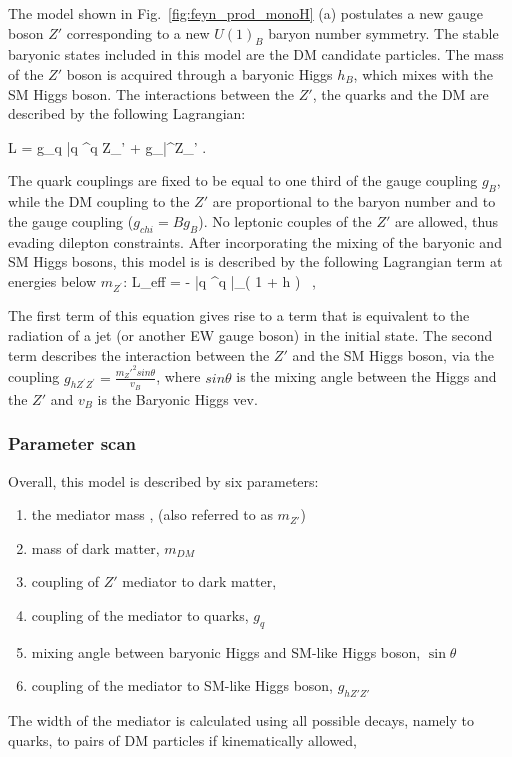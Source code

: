 The model shown in Fig.~\ref{fig:feyn_prod_monoH} (a)
postulates a new gauge boson $Z'$ corresponding to a new $U(1)_B$ baryon 
number symmetry. The stable baryonic states included in this model are the DM candidate particles.
The mass of the $Z'$ boson is acquired through a baryonic Higgs $h_B$, which mixes with the 
SM Higgs boson. The interactions between the $Z'$, the quarks and the DM are described by 
the following Lagrangian:   

\be \label{ZprimeDM}
	L =  g_q  \bar q \gamma^\mu q  Z_\mu' +
%
	 g_\chi  \bar\chi \gamma^\mu \chi Z_\mu' .
\ee

The quark couplings \gq are fixed to be equal to one third of the gauge coupling $g_B$, 
while the DM coupling to the $Z'$ are proportional to the baryon number and to the gauge coupling 
($g_{chi} = B g_B$). No leptonic couples of the $Z'$ are allowed, thus evading dilepton constraints. 
After incorporating the mixing of the baryonic and SM Higgs bosons, this model is 
is described by the following Lagrangian term at energies below $m_{Z^\prime}$: 
 \be \label{U1Beft}
 L_{\rm eff} = -  \bar{q} \gamma^\mu q \bar\chi \gamma_\mu \chi \Big( 1 +  h \Big) \, ,
 \ee

The first term of this equation gives rise to a term that is equivalent to the 
radiation of a jet (or another EW gauge boson) in the initial state. 
The second term describes the interaction between the $Z'$ and the SM Higgs boson,
via the coupling $g_{h Z^\prime Z^\prime} = \frac{m_Z'^2 sin\theta}{v_B}$, where
$sin\theta$ is the mixing angle between the Higgs and the $Z'$ and $v_B$ is the
Baryonic Higgs vev. 


\subsubsection{Parameter scan} 

Overall, this model is described by six parameters:
\begin{enumerate}
	\item the mediator mass \mmed, (also referred to as $m_{Z'}$)
	\item mass of dark matter, $m_{DM}$
	\item coupling of $Z'$ mediator to dark matter, \gdm
	\item coupling of the mediator to quarks, $g_q$
	\item mixing angle between baryonic Higgs and SM-like Higgs boson, $\sin\theta$
	\item coupling of the mediator to SM-like Higgs boson, $g_{hZ'Z'}$
\end{enumerate}
The width of the mediator is calculated using all possible decays, 
namely to quarks, to pairs of DM particles if kinematically allowed, 

